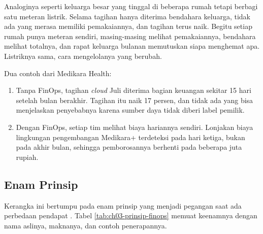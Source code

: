 Analoginya seperti keluarga besar yang tinggal di beberapa rumah tetapi berbagi satu meteran
listrik. Selama tagihan hanya diterima bendahara keluarga, tidak ada yang merasa memiliki
pemakaiannya, dan tagihan terus naik. Begitu setiap rumah punya meteran sendiri, masing-masing
melihat pemakaiannya, bendahara melihat totalnya, dan rapat keluarga bulanan memutuskan siapa
menghemat apa. Listriknya sama, cara mengelolanya yang berubah.

Dua contoh dari Medikara Health:
\begin{enumerate}
  \item Tanpa FinOps, tagihan \textit{cloud} Juli diterima bagian keuangan sekitar 15 hari setelah
        bulan berakhir. Tagihan itu naik 17 persen, dan tidak ada yang bisa menjelaskan penyebabnya
        karena sumber daya tidak diberi label pemilik.
  \item Dengan FinOps, setiap tim melihat biaya hariannya sendiri. Lonjakan biaya lingkungan
        pengembangan Medikara+ terdeteksi pada hari ketiga, bukan pada akhir bulan, sehingga
        pemborosannya berhenti pada beberapa juta rupiah.
\end{enumerate}

\subsection{Enam Prinsip}

Kerangka ini bertumpu pada enam prinsip yang menjadi pegangan saat ada perbedaan pendapat
\cite{finops2026}. Tabel \ref{tab:ch03-prinsip-finops} memuat keenamnya dengan nama aslinya,
maknanya, dan contoh penerapannya.

